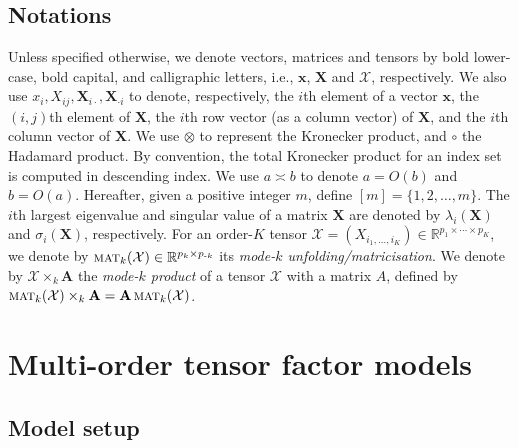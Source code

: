 \documentclass[aos]{imsart}
\theoremstyle{plain}
\theoremstyle{definition}
\def\pmk{p_{\text{-}k}}
\def\mat{\textnormal{\textsc{mat}}}
\def\R{\mathbb{R}}
\def\cX{\mathcal{X}}
\def\bx{\mathbf{x}}
\def\bA{\mathbf{A}}
\def\bX{\mathbf{X}}
\begin{document}
\subsection{Notations}
Unless specified otherwise, we denote vectors, matrices and tensors by bold lower-case, bold capital, and calligraphic letters, i.e., $\bx$, $\bX$ and $\cX$, respectively. We also use $x_i, X_{ij}, \bX_{i\cdot}, \bX_{\cdot i}$ to denote, respectively, the $i$th element of a vector $\bx$, the $(i,j)$th element of $\bX$, the $i$th row vector (as a column vector) of $\bX$, and the $i$th column vector of $\bX$. We use $\otimes$ to represent the Kronecker product, and $\circ$ the Hadamard product. By convention, the total Kronecker product for an index set is computed in descending index. We use $a\asymp b$ to denote $a=O(b)$ and $b=O(a)$. Hereafter, given a positive integer $m$, define $[m]=\{1,2,\dots,m\}$. The $i$th largest eigenvalue and singular value of a matrix $\bX$ are denoted by $\lambda_i(\bX)$ and $\sigma_i(\bX)$, respectively. For an order-$K$ tensor $\cX = (X_{i_1,\ldots,i_K}) \in \mathbb{R}^{p_1\times \cdots\times p_K}$, we denote by $\mat_k(\cX) \in \R^{p_k\times \pmk}$ its \textit{mode-$k$ unfolding/matricisation}. We denote by $\cX \times_k \bA$ the \textit{mode-$k$ product} of a tensor $\cX$ with a matrix $A$, defined by $\mat_k(\cX) \times_k \bA = \bA\, \mat_k(\cX)$.


\section{Multi-order tensor factor models}\label{sec: mm_tfm}

\subsection{Model setup}\label{subsec: model}
\end{document}
